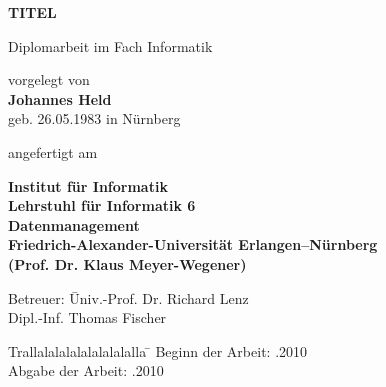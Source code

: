 \begin{titlepage}
  
  \begin{center}
    
    {\Huge \bf
      TITEL
    } 
    
    \vspace*{1cm}
    Diplomarbeit im Fach Informatik
    \vspace{2cm}
    
    {\large vorgelegt von} \\
    \vspace*{0.7cm}
    {\Large \bf Johannes Held} \\
    \vspace*{0.7cm}
    {\large geb. 26.05.1983 in Nürnberg} 
    
    \vspace{2cm}
    
    angefertigt am 

    \vspace{1cm}
    
    {\bf 
      Institut für Informatik \\
      Lehrstuhl für Informatik 6\\
      Datenmanagement \\
      Friedrich-Alexander-Universität Erlangen--Nürnberg \\
      (Prof. Dr. Klaus Meyer-Wegener)
      }
    
    \vspace{1cm}
\end{center}
\begin{tabbing}
    Betreuer: \= Univ.-Prof. Dr. Richard Lenz \\
    \> Dipl.-Inf. Thomas Fischer 
\end{tabbing}
    \vspace{1cm}
    
    
\begin{tabbing}
	Trallalalalalalalalalalla \= \kill
	Beginn der Arbeit:   .2010 \\
  Abgabe der Arbeit:   .2010
\end{tabbing}
    
  
\end{titlepage}

\clearpage{\pagestyle{empty}\cleardoublepage}
